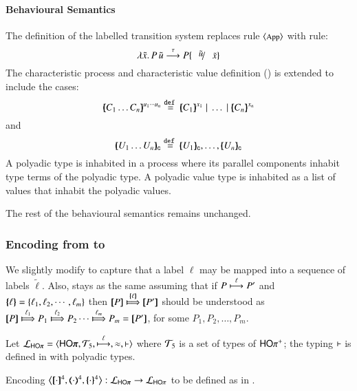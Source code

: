 
\paragraph{Behavioural Semantics}
The definition of the labelled transition system
replaces rule ${\footnotesize \langle \textrm{App} \rangle}$ with rule:
%
\[
	\appl{\abs{\tilde{x}} P}{\tilde{u}} \by{\tau} P\subst{\tilde{u}}{\tilde{x}}
\]
%
The characteristic process and characteristic value 
definition ()
is extended to include the cases:
\[
	\mapchar{C_1 \dots C_n}{u_1 \cdots u_n} \defeq \mapchar{C_1}{x_1} \Par \dots \Par \mapchar{C_n}{x_n}
\]
\noi and
\[
	\omapchar{U_1 \dots U_n} \defeq \omapchar{U_1}, \dots, \omapchar{U_n}
\]
%
A polyadic type is inhabited in a process where its
parallel components inhabit type terms of the polyadic
type. A polyadic value type is inhabited as a list
of values that inhabit the polyadic values.

The rest of the behavioural semantics remains unchanged.


\subsubsection{Encoding from \pHOp to \HOp}

We slightly modify  to capture that a 
label $\ell$ may be mapped into a sequence of labels $\tilde{\ell}$.
Also,  stays as the same
assuming that if 
$P \stackrel{\ell}{\longmapsto} P'$ and $\{\!\!\{\ell\}\!\!\} = \{\ell_1, \ell_2,  \cdots, \ell_m\}$ then
$\map{P} \Hby{\mapa{\ell}} \map{P'}$
should be understood as
$\map{P} \Hby{\ell_1} P_1 \Hby{\ell_2} P_2 \cdots \Hby{\ell_m} P_m =  \map{P'}$,
for some
$P_1, P_2, \ldots, P_m$.

Let $\tyl{L}_{\pHOp}=\calc{\pHOp}{{\cal{T}}_5}{\hby{\ell}}{\wb}{\proves}$
where 
${\cal{T}}_5$ is a set of types of $\mathsf{HO}\pi^{\mathsf +}$;  
the typing $\vdash$ is defined in 
 with polyadic types.

\begin{definition}\rm
	\label{def:enc:pHOp_to_HOp}
	Encoding $\enco{\pmap{\cdot}{4}, \tmap{\cdot}{4}, \mapa{\cdot}^{4}}: \tyl{L}_{\pHOp} \to \tyl{L}_{\HOp}$
	to be defined as in .
\end{definition}

